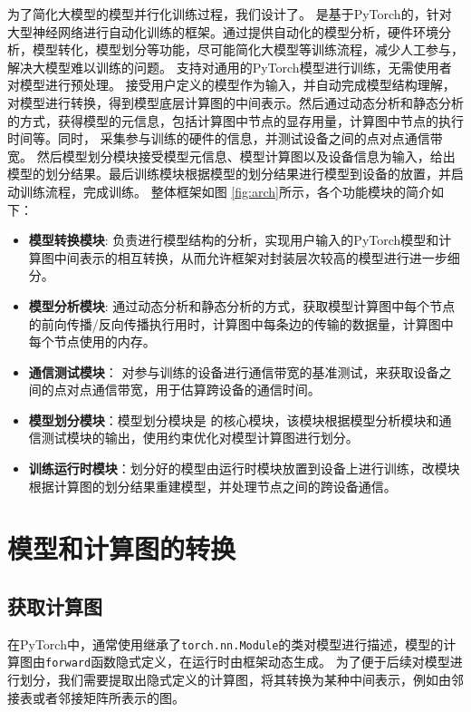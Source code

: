 为了简化大模型的模型并行化训练过程，我们设计了\sys{}。
\sys{} 是基于PyTorch的，针对大型神经网络进行自动化训练的框架。通过提供自动化的模型分析，硬件环境分析，模型转化，模型划分等功能，尽可能简化大模型等训练流程，减少人工参与，解决大模型难以训练的问题。
\sys{} 支持对通用的PyTorch模型进行训练，无需使用者对模型进行预处理。
\sys{}接受用户定义的模型作为输入，并自动完成模型结构理解，对模型进行转换，得到模型底层计算图的中间表示。然后通过动态分析和静态分析的方式，获得模型的元信息，包括计算图中节点的显存用量，计算图中节点的执行时间等。同时，\sys{} 采集参与训练的硬件的信息，并测试设备之间的点对点通信带宽。
然后模型划分模块接受模型元信息、模型计算图以及设备信息为输入，给出模型的划分结果。最后训练模块根据模型的划分结果进行模型到设备的放置，并启动训练流程，完成训练。
整体框架如图 \ref{fig:arch}所示，各个功能模块的简介如下：
\begin{itemize}
	\item \textbf{模型转换模块}: 负责进行模型结构的分析，实现用户输入的PyTorch模型和计算图中间表示的相互转换，从而允许框架对封装层次较高的模型进行进一步细分。
	\item \textbf{模型分析模块}: 通过动态分析和静态分析的方式，获取模型计算图中每个节点的前向传播/反向传播执行用时，计算图中每条边的传输的数据量，计算图中每个节点使用的内存。
	\item \textbf{通信测试模块}： 对参与训练的设备进行通信带宽的基准测试，来获取设备之间的点对点通信带宽，用于估算跨设备的通信时间。
	\item \textbf{模型划分模块}：模型划分模块是\sys{} 的核心模块，该模块根据模型分析模块和通信测试模块的输出，使用约束优化对模型计算图进行划分。
	\item \textbf{训练运行时模块}：划分好的模型由运行时模块放置到设备上进行训练，改模块根据计算图的划分结果重建模型，并处理节点之间的跨设备通信。
\end{itemize}



\section{模型和计算图的转换}
\label{sec:convertion}

\subsection{获取计算图}
在PyTorch中，通常使用继承了\texttt{torch.nn.Module}的类对模型进行描述，模型的计算图由\texttt{forward}函数隐式定义，在运行时由框架动态生成。
为了便于后续对模型进行划分，我们需要提取出隐式定义的计算图，将其转换为某种中间表示，例如由邻接表或者邻接矩阵所表示的图。

